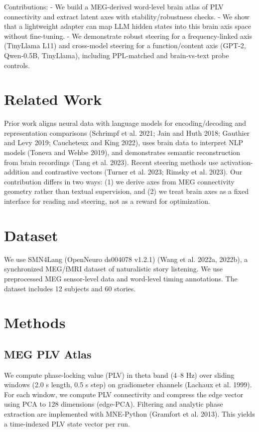 \documentclass[
]{article}
\begin{document}
Contributions: - We build a MEG-derived word-level brain atlas of PLV
connectivity and extract latent axes with stability/robustness checks. -
We show that a lightweight adapter can map LLM hidden states into this
brain axis space without fine-tuning. - We demonstrate robust steering
for a frequency-linked axis (TinyLlama L11) and cross-model steering for
a function/content axis (GPT‑2, Qwen‑0.5B, TinyLlama), including
PPL-matched and brain‑vs‑text probe controls.

\section{Related Work}\label{related-work}

Prior work aligns neural data with language models for encoding/decoding
and representation comparisons (Schrimpf et al. 2021; Jain and Huth
2018; Gauthier and Levy 2019; Caucheteux and King 2022), uses brain data
to interpret NLP models (Toneva and Wehbe 2019), and demonstrates
semantic reconstruction from brain recordings (Tang et al. 2023). Recent
steering methods use activation-addition and contrastive vectors (Turner
et al. 2023; Rimsky et al. 2023). Our contribution differs in two ways:
(1) we derive axes from MEG connectivity geometry rather than textual
supervision, and (2) we treat brain axes as a fixed interface for
reading and steering, not as a reward for optimization.

\section{Dataset}\label{dataset}

We use SMN4Lang (OpenNeuro ds004078 v1.2.1) (Wang et al. 2022a, 2022b),
a synchronized MEG/fMRI dataset of naturalistic story listening. We use
preprocessed MEG sensor-level data and word-level timing annotations.
The dataset includes 12 subjects and 60 stories.

\section{Methods}\label{methods}

\subsection{MEG PLV Atlas}\label{meg-plv-atlas}

We compute phase-locking value (PLV) in theta band (4--8 Hz) over
sliding windows (2.0 s length, 0.5 s step) on gradiometer channels
(Lachaux et al. 1999). For each window, we compute PLV connectivity and
compress the edge vector using PCA to 128 dimensions (edge-PCA).
Filtering and analytic phase extraction are implemented with MNE-Python
(Gramfort et al. 2013). This yields a time-indexed PLV state vector per
run.
\end{document}
